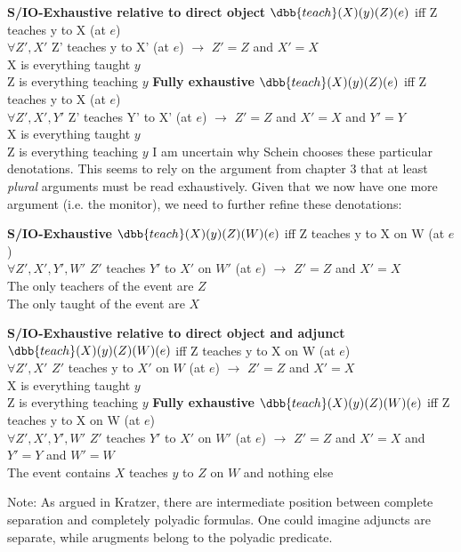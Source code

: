 \pex \textbf{S/IO-Exhaustive relative to direct object}
\a 
$\dbb{teach}(X)(y)(Z)(e)$ iff Z teaches y to X (at $e$)\\
$\forall Z', X'$ Z' teaches y to X' (at $e$) $\rightarrow$ $Z'=Z$ and $X'=X$\\
\a 
X is everything taught $y$\\
Z is everything teaching $y$
\xe
%
\pex \textbf{Fully exhaustive}
\a 
$\dbb{teach}(X)(y)(Z)(e)$ iff Z teaches y to X (at $e$)\\
$\forall Z', X', Y'$ Z' teaches Y' to X' (at $e$) $\rightarrow$ $Z'=Z$ and $X'=X$ and $Y'=Y$\\
\a 
X is everything taught $y$\\
Z is everything teaching $y$
\xe
%
I am uncertain why Schein chooses these particular denotations. This seems to rely on the argument from chapter 3 that at least \emph{plural} arguments must be read exhaustively. Given that we now have one more argument (i.e. the monitor), we need to further refine these denotations:

\pex \textbf{S/IO-Exhaustive}
\a 
$\dbb{teach}(X)(y)(Z)(W)(e)$ iff Z teaches y to X on W (at $e$)\\
$\forall Z', X', Y', W'$ $Z'$ teaches $Y'$ to $X'$ on $W'$ (at $e$) $\rightarrow$ $Z'=Z$ and $X'=X$\\
\a 
The only teachers of the event are $Z$\\
The only taught of the event are $X$
\xe
%

\pex \textbf{S/IO-Exhaustive relative to direct object and adjunct}
\a 
$\dbb{teach}(X)(y)(Z)(W)(e)$ iff Z teaches y to X on W (at $e$)\\
$\forall Z', X'$ $Z'$ teaches y to $X'$ on $W$ (at $e$) $\rightarrow$ $Z'=Z$ and $X'=X$\\
\a 
X is everything taught $y$\\
Z is everything teaching $y$
\xe
%
\pex \textbf{Fully exhaustive}
\a 
$\dbb{teach}(X)(y)(Z)(W)(e)$ iff Z teaches y to X on W (at $e$)\\
$\forall Z', X', Y', W'$ $Z'$ teaches $Y'$ to $X'$ on $W'$ (at $e$) $\rightarrow$ $Z'=Z$ and $X'=X$ and $Y'=Y$ and $W' = W$\\
\a 
The event contains $X$ teaches $y$ to $Z$ on $W$ and nothing else
\xe
%


Note: As argued in Kratzer, there are intermediate position between complete separation and completely polyadic formulas. One could imagine adjuncts are separate, while arugments belong to the polyadic predicate.


